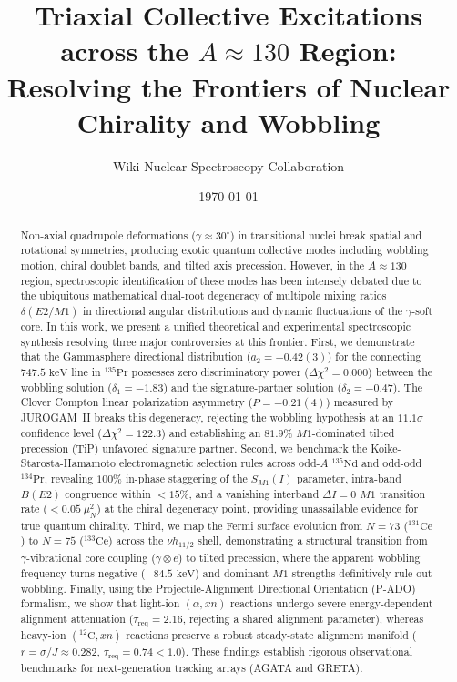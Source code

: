\documentclass[aps,prc,twocolumn,showpacs,superscriptaddress,floatfix,nofootinbib]{revtex4-2}
\begin{document}
\title{Triaxial Collective Excitations across the $A \approx 130$ Region: \\ Resolving the Frontiers of Nuclear Chirality and Wobbling}

\author{Wiki Nuclear Spectroscopy Collaboration}

\date{\today}

\begin{abstract}
Non-axial quadrupole deformations ($\gamma \approx 30^\circ$) in transitional nuclei break spatial and rotational symmetries, producing exotic quantum collective modes including wobbling motion, chiral doublet bands, and tilted axis precession. However, in the $A \approx 130$ region, spectroscopic identification of these modes has been intensely debated due to the ubiquitous mathematical dual-root degeneracy of multipole mixing ratios $\delta(E2/M1)$ in directional angular distributions and dynamic fluctuations of the $\gamma$-soft core. In this work, we present a unified theoretical and experimental spectroscopic synthesis resolving three major controversies at this frontier.
First, we demonstrate that the Gammasphere directional distribution ($a_2 = -0.42(3)$) for the connecting $747.5\text{ keV}$ line in $^{135}\text{Pr}$ possesses zero discriminatory power ($\Delta\chi^2 = 0.000$) between the wobbling solution ($\delta_1 = -1.83$) and the signature-partner solution ($\delta_2 = -0.47$). The Clover Compton linear polarization asymmetry ($P = -0.21(4)$) measured by JUROGAM~II breaks this degeneracy, rejecting the wobbling hypothesis at an $11.1\sigma$ confidence level ($\Delta\chi^2 = 122.3$) and establishing an $81.9\%$ $M1$-dominated tilted precession (TiP) unfavored signature partner.
Second, we benchmark the Koike-Starosta-Hamamoto electromagnetic selection rules across odd-$A$ $^{135}\text{Nd}$ and odd-odd $^{134}\text{Pr}$, revealing $100\%$ in-phase staggering of the $S_{M1}(I)$ parameter, intra-band $B(E2)$ congruence within $<15\%$, and a vanishing interband $\Delta I=0$ $M1$ transition rate ($<0.05\ \mu_N^2$) at the chiral degeneracy point, providing unassailable evidence for true quantum chirality.
Third, we map the Fermi surface evolution from $N=73$ ($^{131}\text{Ce}$) to $N=75$ ($^{133}\text{Ce}$) across the $\nu h_{11/2}$ shell, demonstrating a structural transition from $\gamma$-vibrational core coupling ($\gamma \otimes e$) to tilted precession, where the apparent wobbling frequency turns negative ($-84.5\text{ keV}$) and dominant $M1$ strengths definitively rule out wobbling.
Finally, using the Projectile-Alignment Directional Orientation (P-ADO) formalism, we show that light-ion $(\alpha, xn)$ reactions undergo severe energy-dependent alignment attenuation ($\tau_{\text{req}} = 2.16$, rejecting a shared alignment parameter), whereas heavy-ion $(^{12}\text{C}, xn)$ reactions preserve a robust steady-state alignment manifold ($r = \sigma/J \approx 0.282$, $\tau_{\text{req}} = 0.74 < 1.0$).
These findings establish rigorous observational benchmarks for next-generation tracking arrays (AGATA and GRETA).
\end{abstract}
\end{document}
